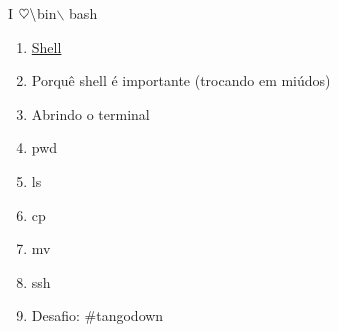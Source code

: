 \begin{center}
	{\huge I $\heartsuit\space  \backslash$bin$\backslash$ bash}
\end{center}

\begin{enumerate}
	\item \href{https://guialinux.uniriotec.br/shell/}{Shell}
	\item Porquê shell é importante (trocando em miúdos)
	\item Abrindo o terminal
	\item pwd
	\item ls
	\item cp
	\item mv
	\item ssh
	\item Desafio: \#tangodown
\end{enumerate}

\vfill\null\columnbreak